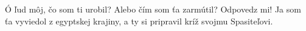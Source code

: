 Ó ľud môj, čo som ti urobil?
Alebo čím som ťa zarmútil? Odpovedz mi!
\versseparator
Ja som ťa vyviedol z egyptskej krajiny,
a ty si pripravil kríž svojmu Spasiteľovi.